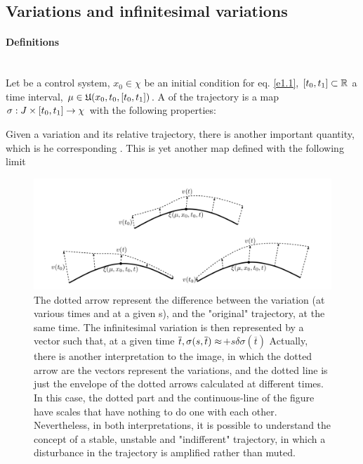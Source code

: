 \subsection{Variations and infinitesimal variations}

\paragraph{Definitions}\mbox{}\\
Let \controlSystem\space be a control system, $x_0\in\chi$ be an initial condition for eq. \eqref{e1.1}, $[t_0,t_1]\subset\mathbb{R}$ a time interval, $\mu\in\mathfrak{U}(x_0,t_0,[t_0,t_1])$. A  of the trajectory \trajWinCond{\cdot} is a map $\sigma:J\times[t_0,t_1]\rightarrow\chi$ with the following properties: 

Given a variation and its relative trajectory, there is another important quantity, which is he corresponding . This is yet another map defined with the following limit
\begin{figure}[H]
	\includegraphics[width=\linewidth]{imgs/variations.png}
	\caption{The dotted arrow represent the difference between the variation (at various times and at a given s), and the "original" trajectory, at the same time. The infinitesimal variation is then represented by a vector such that, at a given time $\overline{t},\space\sigma(s,\overline{t})\approx$$+s\delta\sigma(\overline{t})$
		Actually, there is another interpretation to the image, in which the dotted arrow are the vectors represent the  variations, and the dotted line is just the envelope of the dotted arrows calculated at different times. In this case, the dotted part and the continuous-line of the figure have scales that have nothing to do one with each other. Nevertheless, in both interpretations, it is possible to understand the concept of a stable, unstable and "indifferent" trajectory, in which a disturbance in the trajectory is amplified rather than muted.}
	\label{fig-variations}
\end{figure}


